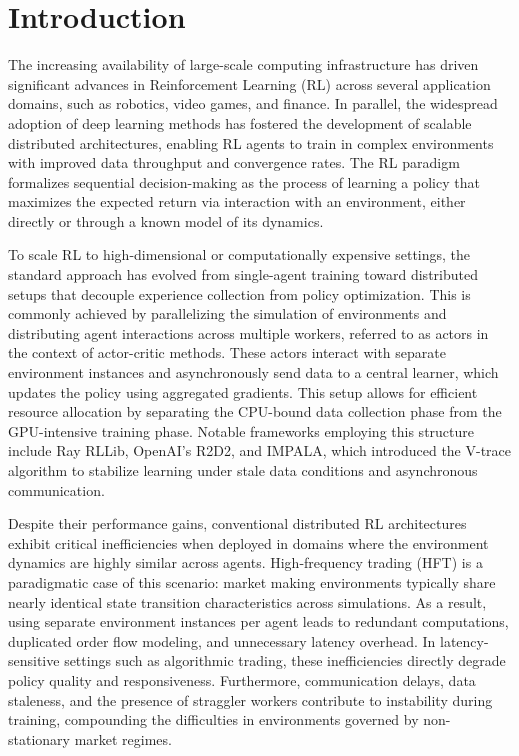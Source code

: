 
\chapter{Introduction}
\label{ch:introduction}

The increasing availability of large-scale computing infrastructure has driven significant advances
in Reinforcement Learning (RL) across several application domains, such as robotics, video games, and finance.
In parallel, the widespread adoption of deep learning methods has fostered the development of scalable distributed architectures,
enabling RL agents to train in complex environments with improved data throughput and convergence rates.
The RL paradigm formalizes sequential decision-making as the process of learning a policy that maximizes the expected return via interaction with an environment,
either directly or through a known model of its dynamics.

To scale RL to high-dimensional or computationally expensive settings, the standard approach has evolved from single-agent
training toward distributed setups that decouple experience collection from policy optimization.
This is commonly achieved by parallelizing the simulation of environments and distributing agent interactions across multiple workers,
referred to as actors in the context of actor-critic methods.
These actors interact with separate environment instances and asynchronously send data to a central learner,
which updates the policy using aggregated gradients.
This setup allows for efficient resource allocation by separating the CPU-bound data collection phase from the GPU-intensive training phase.
Notable frameworks employing this structure include Ray RLLib, OpenAI’s R2D2, and IMPALA,
which introduced the V-trace algorithm to stabilize learning under stale data conditions and asynchronous communication.

Despite their performance gains, conventional distributed RL architectures exhibit critical inefficiencies when
deployed in domains where the environment dynamics are highly similar across agents.
High-frequency trading (HFT) is a paradigmatic case of this scenario: market making environments typically share nearly
identical state transition characteristics across simulations.
As a result, using separate environment instances per agent leads to redundant computations, duplicated order flow modeling, and unnecessary latency overhead.
In latency-sensitive settings such as algorithmic trading, these inefficiencies directly degrade policy quality and responsiveness.
Furthermore, communication delays, data staleness, and the presence of straggler workers contribute to instability during training,
compounding the difficulties in environments governed by non-stationary market regimes.

